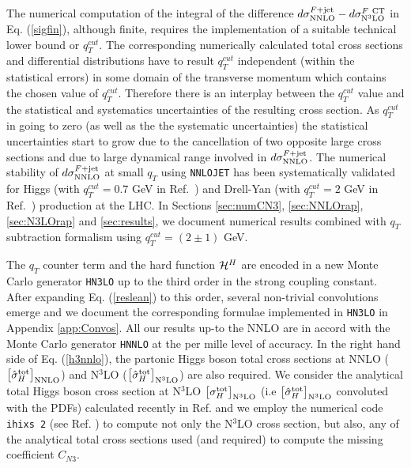 \documentclass[12pt]{article}
\def\qt{q_T}
\begin{document}
The numerical computation of the integral of the difference $d{\sigma}_{\rm{NNLO}}^{F+{\rm jet}}-d{\sigma}_{\rm{N}^3\rm{LO}}^{F {\rm\ CT}}$ in Eq. (\ref{sigfin}), although finite, requires the implementation of a suitable technical lower bound or $q_T^{cut}$. The corresponding numerically calculated total cross sections and differential distributions have to result $q_T^{cut}$ independent (within the statistical errors) in some domain of the transverse momentum which contains the chosen value of $q_T^{cut}$. Therefore there is an interplay between the $q_T^{cut}$ value and the statistical and systematics uncertainties of the resulting cross section. As $q_T^{cut}$ in going to zero (as well as the the systematic uncertainties) the statistical uncertainties start to grow due to the cancellation of two opposite large cross sections and due to large dynamical range involved in $d{\sigma}_{\rm{NNLO}}^{F+{\rm jet}}$. The numerical stability of $d{\sigma}_{\rm{NNLO}}^{F+{\rm jet}}$ at small $q_T$ using \texttt{NNLOJET} has been systematically validated for Higgs (with $q_T^{cut}=0.7$ GeV in Ref.~\cite{Chen:2018pzu}) and Drell-Yan (with $q_T^{cut}=2$ GeV in Ref.~\cite{Bizon:2018foh}) production at the LHC. In Sections \ref{sec:numCN3}, \ref{sec:NNLOrap}, \ref{sec:N3LOrap} and \ref{sec:results}, we document numerical results combined with $\qt$ subtraction formalism using $q_T^{cut}=(2\pm 1)$ GeV.

The $q_T$ counter term and the hard function ${\cal H}^H$ are encoded in a new Monte Carlo generator \texttt{HN3LO} up to the third order in the strong coupling constant. After expanding Eq. (\ref{reslean}) to this order, several non-trivial convolutions emerge and we document the corresponding formulae implemented in \texttt{HN3LO} in Appendix \ref{app:Convos}. All our results up-to the NNLO are in accord with the Monte Carlo generator \texttt{HNNLO} \cite{Catani:2007vq} at the per mille level of accuracy. In the right hand side of Eq.  (\ref{h3nnlo}), the partonic Higgs boson total cross sections at NNLO ($\bigl[ {\hat \sigma}_{H}^{{\rm {tot}}} \bigr]_{\rm NNLO}$) and N$^{3}$LO  ($\bigl[ {\hat \sigma}_{H}^{{\rm {tot}}} \bigr]_{\rm N^{3}LO}$) are also required. We consider the analytical total Higgs boson cross section at N$^{3}$LO $\bigl[  \sigma_{H}^{{\rm {tot}}} \bigr]_{\rm N^{3}LO}$ (i.e $\bigl[ {\hat \sigma}_{H}^{{\rm {tot}}} \bigr]_{\rm N^{3}LO}$ convoluted with the PDFs)  calculated recently in Ref. \cite{Mistlberger:2018etf} and we employ the numerical code \texttt{ihixs 2} (see Ref. \cite{Dulat:2018rbf}) to compute not only the N$^{3}$LO cross section, but also, any of the analytical total cross sections used (and required) to compute the missing coefficient $C_{N3}$. 
\end{document}
